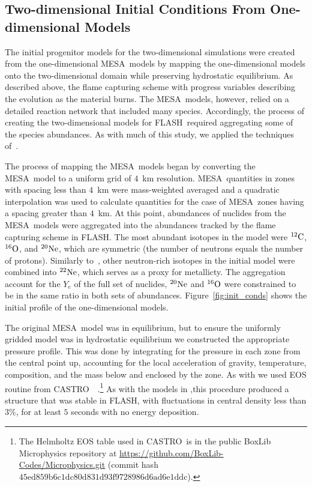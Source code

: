 \documentclass[iop,apj]{emulateapj}
\newcommand{\figref}[1]{Figure~\ref{#1}}
\newcommand{\C}[1]{\ensuremath{{}^{#1}{\rm C}}}
\newcommand{\Ox}[1]{\ensuremath{{}^{#1}{\rm O}}}
\newcommand{\Ne}[1]{\ensuremath{{}^{#1}{\rm Ne}}}
\newcommand{\code}[1]{\textsc{#1}}
\newcommand{\FLASH}{\code{FLASH}}
\newcommand{\CASTRO}{\code{CASTRO}}
\newcommand{\MESA}{\code{MESA}}
\begin{document}
\subsection{Two-dimensional Initial Conditions From One-dimensional Models}

The initial progenitor models for the two-dimensional simulations were
created from the one-dimensional \MESA\ models by mapping the one-dimensional
models onto the two-dimensional domain while 
preserving hydrostatic equilibrium.
As described above, the flame capturing scheme with progress
variables describing the evolution as the material burns. The \MESA\
models, however, relied on a detailed reaction network that included
many species. Accordingly, the process of creating the two-dimensional
models for \FLASH\ required aggregating some of the species abundances.
As with much of this study, we applied the 
techniques of~\citet{willcoxetal2016}.


The process of mapping the \MESA\ models began by converting 
the \MESA\ model to a uniform grid of $4$~km resolution. \MESA\ 
quantities in zones with spacing less than $4$~km 
were mass-weighted averaged and a quadratic interpolation
was used to calculate quantities for the case of \MESA\ zones having
a spacing greater than $4$~km. At this point, 
abundances of nuclides from the \MESA\ models were aggregated
into the abundances tracked by the flame capturing scheme in
\FLASH.
The most abundant isotopes in the model were \C{12}, \Ox{16},
and \Ne{20}, which are symmetric (the number of neutrons 
equals the number of protons). Similarly to~\citet{willcoxetal2016}, 
other neutron-rich isotopes in the initial model were combined into 
\Ne{22}, which serves as a proxy for metallicty. The aggregation
account for the $Y_e$ of the full set of nuclides, \Ne{20} 
and \Ox{16} were constrained to be in the same ratio in both 
sets of abundances. \figref{fig:init_conds} shows the initial
profile of the one-dimensional models.

The original \MESA\ model was in equilibrium, but to ensure
the uniformly gridded model was in hydrostatic equilibrium we 
constructed the appropriate pressure profile. This was done by
integrating for the pressure in each zone from the central point up, 
accounting for the local acceleration of gravity, temperature,
composition, and the mass below and enclosed by the zone. As
with \citet{willcoxetal2016} we used
EOS routine from 
\CASTRO\ ~\citep{timmes.swesty:accuracy,castro1}.\footnote{The 
Helmholtz EOS table used in \CASTRO\ is in the public BoxLib 
Microphysics repository at
  \url{https://github.com/BoxLib-Codes/Microphysics.git} (commit 
  hash $\mathrm{45ed859b6c1dc80d831d93f9728986d6ad6e1ddc}$).} As 
 with the models in \citet{willcoxetal2016},this procedure produced 
 a structure that was stable in \FLASH, with fluctuations in central
density less than $3\%$, for at least $5$ seconds with no energy
deposition.
\end{document}
